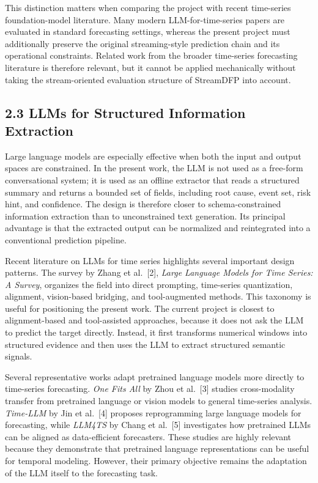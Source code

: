 \documentclass[
  11pt,
  a4paper]{article}
\begin{document}
This distinction matters when comparing the project with recent
time-series foundation-model literature. Many modern LLM-for-time-series
papers are evaluated in standard forecasting settings, whereas the
present project must additionally preserve the original streaming-style
prediction chain and its operational constraints. Related work from the
broader time-series forecasting literature is therefore relevant, but it
cannot be applied mechanically without taking the stream-oriented
evaluation structure of StreamDFP into account.

\hypertarget{llms-for-structured-information-extraction}{%
\subsection{2.3 LLMs for Structured Information
Extraction}\label{llms-for-structured-information-extraction}}

Large language models are especially effective when both the input and
output spaces are constrained. In the present work, the LLM is not used
as a free-form conversational system; it is used as an offline extractor
that reads a structured summary and returns a bounded set of fields,
including root cause, event set, risk hint, and confidence. The design
is therefore closer to schema-constrained information extraction than to
unconstrained text generation. Its principal advantage is that the
extracted output can be normalized and reintegrated into a conventional
prediction pipeline.

Recent literature on LLMs for time series highlights several important
design patterns. The survey by Zhang et al.~{[}2{]}, \emph{Large
Language Models for Time Series: A Survey}, organizes the field into
direct prompting, time-series quantization, alignment, vision-based
bridging, and tool-augmented methods. This taxonomy is useful for
positioning the present work. The current project is closest to
alignment-based and tool-assisted approaches, because it does not ask
the LLM to predict the target directly. Instead, it first transforms
numerical windows into structured evidence and then uses the LLM to
extract structured semantic signals.

Several representative works adapt pretrained language models more
directly to time-series forecasting. \emph{One Fits All} by Zhou et
al.~{[}3{]} studies cross-modality transfer from pretrained language or
vision models to general time-series analysis. \emph{Time-LLM} by Jin et
al.~{[}4{]} proposes reprogramming large language models for
forecasting, while \emph{LLM4TS} by Chang et al.~{[}5{]} investigates
how pretrained LLMs can be aligned as data-efficient forecasters. These
studies are highly relevant because they demonstrate that pretrained
language representations can be useful for temporal modeling. However,
their primary objective remains the adaptation of the LLM itself to the
forecasting task.
\end{document}
